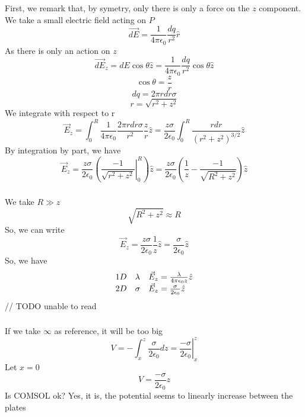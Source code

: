 \subsubsection{}
First, we remark that, by symetry, only there is only a force on the \(z\)
component.
We take a small electric field acting on \(P\)
\[
	\vec{dE} = \frac{1}{4 \pi \epsilon_0} \frac{dq}{r^2} \hat{r}
\]
As there is only an action on \(z\)
\[
	\vec{dE}_z = dE \cos{\theta} \hat{z}
	= \frac{1}{4 \pi \epsilon_0} \frac{dq}{r^2} \cos{\theta} \hat{z}
\]
\[
	\cos{\theta} = \frac{z}{r}
\]
\[
	dq = 2 \pi r dr \sigma
\]
\[
	r = \sqrt{r^2+z^2}
\]
We integrate with respect to r
\[
	\vec{E}_z = \int_0^R \frac{1}{4 \pi \epsilon_0}
		\frac{2 \pi r dr \sigma}{r^2} \frac{z}{r} \hat{z}
	= \frac{z \sigma}{2 \epsilon_0}
	\int_0^R \frac{r dr}{(r^2 + z^2)^{3/2}} \hat{z}
\]
By integration by part, we have
\[
	\vec{E}_z = \frac{z \sigma}{2 \epsilon_0}
	( \left. \frac{-1}{\sqrt{r^2+z^2}} \right |_0^R ) \hat{z}
	= \frac{z \sigma}{2 \epsilon_0}
		( \frac{1}{z} - \frac{-1}{\sqrt{R^2+z^2}} ) \hat{z}
\]

\subsubsection{}

We take \(R \gg z\)
\[
	\sqrt{R^2 + z^2} \approx R
\]
So, we can write
\[
	\vec{E}_z = \frac{z \sigma}{2 \epsilon_0} \frac{1}{z} \hat{z}
	= \frac{\sigma}{2 \epsilon_0} \hat{z}
\]
So, we have
\[
	\begin{array}{l l l}
		1D & \lambda &
		\vec{E}_z = \frac{\lambda}{4 \pi \epsilon_0 z} \hat{z} \\
		2D & \sigma  &
		\vec{E}_z = \frac{\sigma}{2 \epsilon_0} \hat{z}
	\end{array}
\]
// TODO unable to read

\subsubsection{}

If we take \(\infty\) as reference, it will be too big
\[
	V = - \int_{x}^z \frac{\sigma}{2 \epsilon_0} dz
	= \left. \frac{- \sigma}{2 \epsilon_0} \right|_x^z
\]
Let \(x = 0\)
\[
	V = \frac{- \sigma}{2 \epsilon_0} z
\]
Is COMSOL ok? Yes, it is, the potential seems to linearly increase between the
plates

\subsubsection{}

